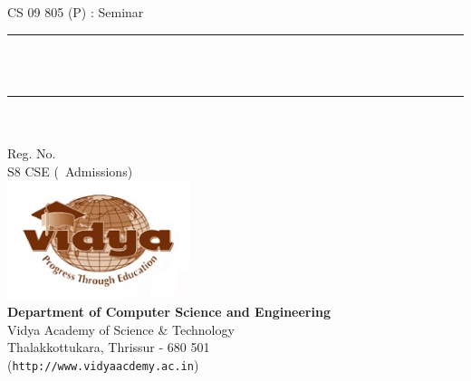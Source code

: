 %
%
\begin{titlepage}
\newcommand{\HRule}{\rule{\linewidth}{0.5mm}}
\begin{center}
{\large \sffamily CS 09 805 (P) : Seminar}\\[0.2cm]
\HRule \\[0.5cm]
{ \huge\sffamily \bfseries \vtitle}\\[0.2cm]
\HRule \\[5.20cm]
{\Large \sffamily\bfseries  \vauthor}\\
{\large \sffamily Reg. No. \vregisternumber\\ 
S8 CSE (\vadmissionyear\ Admissions)} \\[4cm] 
\includegraphics[width=0.40\textwidth]{VidyaLogo}\\[0.2cm]
{\Large \sffamily\bfseries Department of Computer Science and Engineering}\\ {\large\sffamily Vidya Academy of Science \& Technology\\ \normalsize Thalakkottukara, Thrissur - 680 501}\\
({\tt http://www.vidyaacdemy.ac.in})\\
\end{center}
\end{titlepage}
%
%
